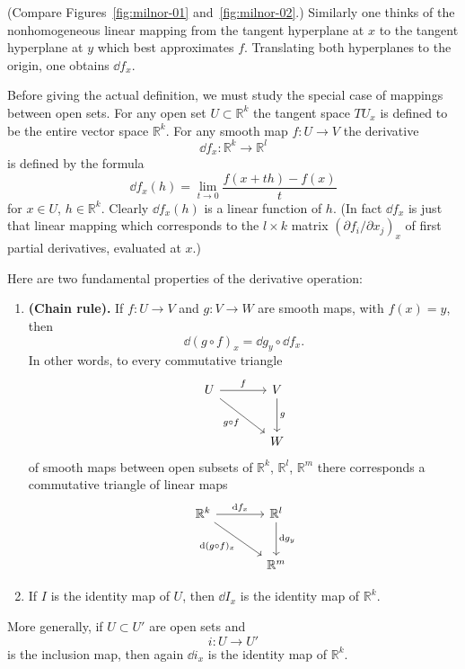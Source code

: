 
(Compare Figures~\ref{fig:milnor-01} and~\ref{fig:milnor-02}.) Similarly one thinks of the nonhomogeneous linear mapping from the tangent hyperplane at $x$ to the tangent hyperplane at $y$ which best approximates $f$. Translating both hyperplanes to the origin, one obtains $\dd f_x$.

Before giving the actual definition, we must study the special case of mappings between open sets. For any open set $U \subset \mathbb{R}^k$ the tangent space $TU_x$ is defined to be the entire vector space $\mathbb{R}^k$. For any smooth map $f: U \to V$ the derivative
\[
\dd f_x : \mathbb{R}^k \to \mathbb{R}^l
\]
is defined by the formula
\[
\dd f_x(h) = \lim_{t \to 0} \frac{f(x + th) - f(x)}{t}
\]
for $x \in U$, $h \in \mathbb{R}^k$. Clearly $\dd f_x(h)$ is a linear function of $h$. (In fact $\dd f_x$ is just that linear mapping which corresponds to the $l \times k$ matrix $(\partial f_i / \partial x_j)_x$ of first partial derivatives, evaluated at $x$.)

Here are two fundamental properties of the derivative operation:

\begin{enumerate}
\item \textbf{(Chain rule).} If $f : U \to V$ and $g : V \to W$ are smooth maps, with $f(x) = y$, then
\[
\dd(g \circ f)_x = \dd g_y \circ \dd f_x.
\]
In other words, to every commutative triangle
\[
\begin{tikzcd}[column sep=large, row sep=large]
U \arrow[r, "f"] \arrow[dr, "{g \circ f}"'] & V \arrow[d, "g"] \\
& W
\end{tikzcd}
\]
of smooth maps between open subsets of $\mathbb{R}^k$, $\mathbb{R}^l$, $\mathbb{R}^m$ there corresponds a commutative triangle of linear maps
\[
\begin{tikzcd}[column sep=large, row sep=large]
\mathbb{R}^k \arrow[r, "\dd f_x"] \arrow[dr, "{\dd(g \circ f)_x}"'] & \mathbb{R}^l \arrow[d, "\dd g_y"] \\
& \mathbb{R}^m
\end{tikzcd}
\]
\item If $I$ is the identity map of $U$, then $\dd I_x$ is the identity map of $\mathbb{R}^k$.
\end{enumerate}

More generally, if $U \subset U'$ are open sets and
\[
i: U \to U'
\]
is the inclusion map, then again $\dd i_x$ is the identity map of $\mathbb{R}^k$.

